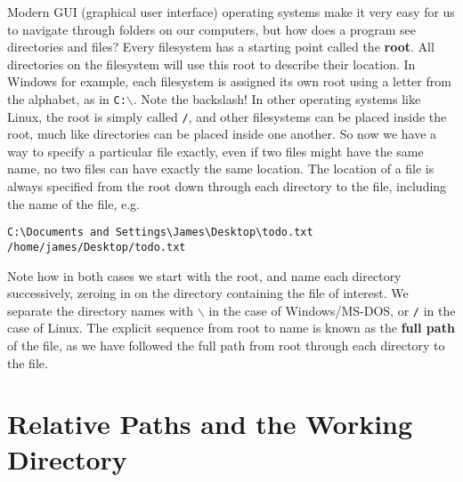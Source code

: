 \documentclass[a4paper,11pt]{article}
\begin{document}
Modern GUI (graphical user interface) operating systems make it very easy for us to navigate through folders on our computers, but how does a program see directories and files? Every filesystem has a starting point called the   \textbf{root}. All directories on the filesystem will use this root to describe their location.   In Windows for example, each filesystem is assigned its own root using a   letter from the alphabet, as in 
\texttt{C:$\backslash$}. Note the backslash!   In other operating systems like Linux, the root is simply   called 
\texttt{/}, and other filesystems can be placed inside the   root, much like directories can be placed inside one another. So now we   have a way to specify a particular file exactly, even if two files   might have the same name, no two files can have exactly the same   location. The location of a file is always specified from the root down   through each directory to the file, including the name of the file,   e.g.
\begin{lstlisting}
C:\Documents and Settings\James\Desktop\todo.txt
/home/james/Desktop/todo.txt\end{lstlisting}

Note how in both cases we start with the root, and name each   directory successively, zeroing in on the directory containing the file   of interest. We separate the directory names with 
\texttt{$\backslash$} in the   case of Windows/MS-DOS, or 
\texttt{/} in the case of Linux.   The explicit sequence from root to name is known as the \textbf{full   path} of the file, as we have followed the full path from root   through each directory to the file.

\section{Relative Paths and the Working Directory}
\end{document}
